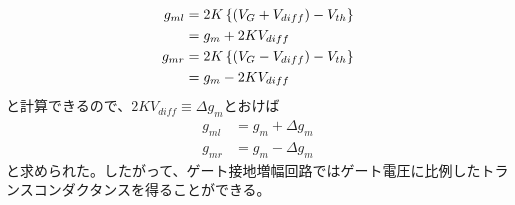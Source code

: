             \begin{align}
                g_{ml}&=2K\left\{ (V_{G}+V_{diff}) -V_{th} \right\}     \notag\\
                &=g_{m}+2KV_{diff}      \notag\\
                g_{mr}&=2K\left\{ (V_{G}-V_{diff}) -V_{th} \right\}     \notag\\
                &=g_{m}-2KV_{diff}      \notag
            \end{align}
            と計算できるので、$2KV_{diff}\equiv\Delta g_{m}$とおけば
            \begin{align}
                g_{ml}&=g_{m}+\Delta g_{m}   \label{eq:2_dgml}\\
                g_{mr}&=g_{m}-\Delta g_{m}   \label{eq:2_dgmr}
            \end{align}
            と求められた。したがって、ゲート接地増幅回路ではゲート電圧に比例したトランスコンダクタンスを得ることができる。
            \newpage
            

